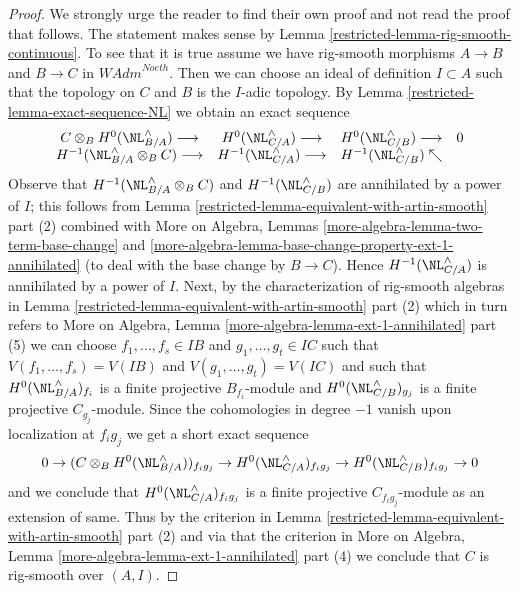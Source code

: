 \begin{proof}

We strongly urge the reader to find their own proof and not read the proof
that follows. The statement makes sense by
Lemma \ref{restricted-lemma-rig-smooth-continuous}.
To see that it is true assume we have rig-smooth morphisms
$A \to B$ and $B \to C$ in $\textit{WAdm}^{Noeth}$.
Then we can choose an ideal of definition $I \subset A$
such that the topology on $C$ and $B$ is the $I$-adic topology.
By Lemma \ref{restricted-lemma-exact-sequence-NL} we obtain an exact sequence
$$
\begin{array}{cccc}C \otimes_B H^0(\NL_{B/A}^\wedge) \longrightarrow & H^0(\NL_{C/A}^\wedge) \longrightarrow & H^0(\NL_{C/B}^\wedge) \longrightarrow & 0 \\ H^{-1}(\NL_{B/A}^\wedge \otimes_B C) \longrightarrow & H^{-1}(\NL_{C/A}^\wedge) \longrightarrow & H^{-1}(\NL_{C/B}^\wedge) \nwarrow & \end{array}
$$
Observe that $H^{-1}(\NL_{B/A}^\wedge \otimes_B C)$
and $H^{-1}(\NL_{C/B}^\wedge)$ are annihilated by
a power of $I$; this follows from
Lemma \ref{restricted-lemma-equivalent-with-artin-smooth} part (2)
combined with
More on Algebra, Lemmas \ref{more-algebra-lemma-two-term-base-change} and
\ref{more-algebra-lemma-base-change-property-ext-1-annihilated}
(to deal with the base change by $B \to C$).
Hence $H^{-1}(\NL_{C/A}^\wedge)$ is annihilated by a power of $I$.
Next, by the characterization of rig-smooth algebras in
Lemma \ref{restricted-lemma-equivalent-with-artin-smooth} part (2)
which in turn refers to
More on Algebra, Lemma \ref{more-algebra-lemma-ext-1-annihilated} part (5)
we can choose $f_1, \ldots, f_s \in IB$ and $g_1, \ldots, g_t \in IC$
such that $V(f_1, \ldots, f_s) = V(IB)$ and
$V(g_1, \ldots, g_t) = V(IC)$ and such that
$H^0(\NL_{B/A}^\wedge)_{f_i}$ is a finite projective $B_{f_i}$-module and
$H^0(\NL_{C/B}^\wedge)_{g_j}$ is a finite projective $C_{g_j}$-module.
Since the cohomologies in degree $-1$ vanish upon localization at
$f_ig_j$ we get a short exact sequence
$$
0 \to
(C \otimes_B H^0(\NL_{B/A}^\wedge))_{f_ig_j} \to
H^0(\NL_{C/A}^\wedge)_{f_ig_j} \to
H^0(\NL_{C/B}^\wedge)_{f_ig_j} \to 0
$$
and we conclude that $H^0(\NL_{C/A}^\wedge)_{f_ig_j}$ is a finite
projective $C_{f_ig_j}$-module as an extension of same.
Thus by the criterion in
Lemma \ref{restricted-lemma-equivalent-with-artin-smooth} part (2)
and via that the criterion in
More on Algebra, Lemma \ref{more-algebra-lemma-ext-1-annihilated} part (4)
we conclude that $C$ is rig-smooth over $(A, I)$.
\end{proof}

